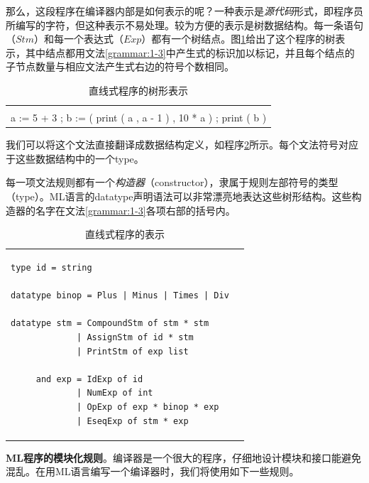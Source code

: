 \documentclass[cn,11pt,chinese]{elegantbook}
\begin{document}
那么，这段程序在编译器内部是如何表示的呢？一种表示是\textit{源代码}形式，即程序员所编写的字符，但这种表示不易处理。较为方便的表示是树数据结构。每一条语句（$Stm$）和每一个表达式（$Exp$）都有一个树结点。图\ref{fig:1-4}给出了这个程序的树表示，其中结点都用文法\ref{grammar:1-3}中产生式的标识加以标记，并且每个结点的子节点数量与相应文法产生式右边的符号个数相同。

\renewcommand\tablename{图}
\begin{table}[htbp]
\centering
\begin{tabular}{l}
{
  \fontsize{6pt}{7.2pt}\selectfont
  
} \\
a := 5 + 3 ; b := ( print ( a , a - 1 ) , 10 * a ) ; print ( b )
\end{tabular}
\caption{直线式程序的树形表示}
\label{fig:1-4}
\end{table}
\renewcommand\tablename{表}

我们可以将这个文法直接翻译成数据结构定义，如程序\ref{code:1-5}所示。每个文法符号对应于这些数据结构中的一个type。

每一项文法规则都有一个\textit{构造器}（constructor），隶属于规则左部符号的类型（type）。ML语言的datatype声明语法可以非常漂亮地表达这些树形结构。这些构造器的名字在文法\ref{grammar:1-3}各项右部的括号内。

\renewcommand\tablename{程序}
\begin{table}[htbp]
\centering
\begin{tabular}{p{} r}
\begin{verbatim}
type id = string

datatype binop = Plus | Minus | Times | Div

datatype stm = CompoundStm of stm * stm
             | AssignStm of id * stm
             | PrintStm of exp list

     and exp = IdExp of id
             | NumExp of int
             | OpExp of exp * binop * exp
             | EseqExp of stm * exp
\end{verbatim}
\end{tabular}
\caption{直线式程序的表示}
\label{code:1-5}
\end{table}
\renewcommand\tablename{表}

\textbf{ML程序的模块化规则}。编译器是一个很大的程序，仔细地设计模块和接口能避免混乱。在用ML语言编写一个编译器时，我们将使用如下一些规则。
\end{document}

